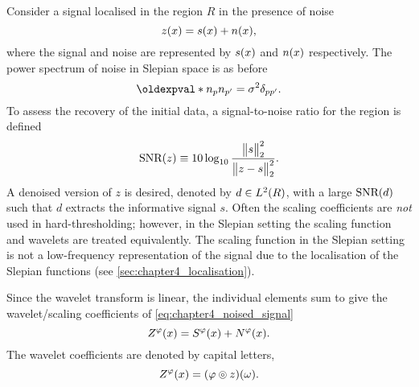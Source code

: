 Consider a signal localised in the region \(R\) in the presence of noise
%
\begin{equation}\label{eq:chapter4_noised_signal}
	z(x)
	= s(x) + n(x),
\end{equation}
%
where the signal and noise are represented by \(s(x)\) and \(n(x)\) respectively.
The power spectrum of noise in Slepian space is as before
%
\begin{equation}
	\expval{\slepian{n} \slepian[']{n}}
	= \sigma^{2} \delta_{pp'}.
\end{equation}
%
To assess the recovery of the initial data, a signal-to-noise ratio for the region is defined
%
\begin{equation}
	\text{SNR}(z)
	\equiv 10 \log_{10} \frac{{\big\lVert s\big\rVert}_{2}^{2}}{{\big\lVert z - s\big\rVert}_{2}^{2}}.
\end{equation}
%
A denoised version of \(z\) is desired, denoted by \(d \in L^{2}(R)\), with a large \(\text{SNR}(d)\) such that \(d\) extracts the informative signal \(s\).
Often the scaling coefficients are \emph{not} used in hard-thresholding; however, in the Slepian setting the scaling function and wavelets are treated equivalently.
The scaling function in the Slepian setting is not a low-frequency representation of the signal due to the localisation of the Slepian functions (see \cref{sec:chapter4_localisation}).

Since the wavelet transform is linear, the individual elements sum to give the wavelet/scaling coefficients of \cref{eq:chapter4_noised_signal}
%
\begin{equation}
	Z^{\varphi}(x)
	= S^{\varphi}(x) + N^{\varphi}(x).
\end{equation}
%
The wavelet coefficients are denoted by capital letters, \ie{}
%
\begin{equation}
	Z^{\varphi}(x) = (\varphi \circledcirc{} z)(\omega).
\end{equation}






